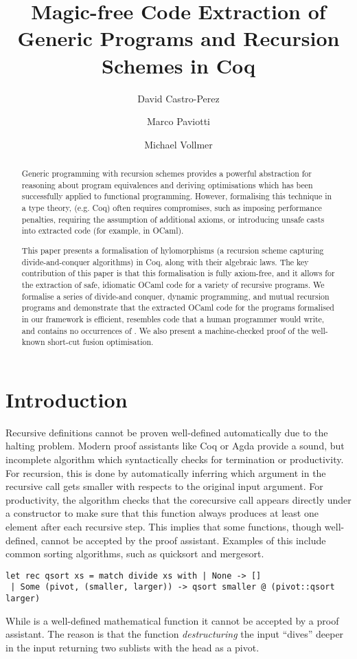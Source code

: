 \documentclass[ a4paper, UKenglish, cleveref, autoref, thm-restate]{lipics-v2021}
\title{Magic-free Code Extraction of Generic Programs and Recursion Schemes in
Coq}
\author{David Castro-Perez}{School of Computing, University of Kent}{d-castro-perez@kent.ac.uk}{}{}
\author{Marco Paviotti}{School of Computing, University of Kent}{m.paviotti@kent.ac.uk}{}{}
\author{Michael Vollmer}{School of Computing, University of Kent}{m.vollmer@kent.ac.uk}{}{}
\begin{document}
\maketitle

\begin{abstract}
  Generic programming with recursion schemes provides a powerful abstraction
  for reasoning about program equivalences and deriving optimisations which has
  been successfully applied to functional programming. However, formalising
  this technique in a type theory, (e.g. Coq) often requires compromises, such
  as imposing performance penalties, requiring the assumption of additional
  axioms, or introducing unsafe casts into extracted code (for example,
   in OCaml).

  This paper presents a formalisation of hylomorphisms (a recursion scheme
  capturing divide-and-conquer algorithms) in Coq, along with their algebraic
  laws. The key contribution of this paper is that this formalisation is fully
  axiom-free, and it allows for the extraction of safe, idiomatic OCaml
  code for a variety of recursive programs. We formalise a series of divide-and
  conquer, dynamic programming, and mutual recursion programs and demonstrate
  that the extracted OCaml code for the programs formalised in our framework is
  efficient, resembles code that a human programmer would write, and contains
  no occurrences of . We also present a machine-checked proof
  of the well-known short-cut fusion optimisation.
\end{abstract}

\section{Introduction}
\label{sec:intro}
Recursive definitions cannot be proven well-defined automatically due to the
halting problem. Modern proof assistants like Coq or Agda provide a sound, but
incomplete algorithm which syntactically checks for termination or
productivity.  For recursion, this is done by automatically inferring
which argument in the recursive call gets smaller with respects to the original
input argument.  For productivity, the algorithm checks that the corecursive
call appears directly under a constructor to make sure that this function
always produces at least one element after each recursive step.
This implies that some functions, though well-defined, cannot be accepted by
the proof assistant. Examples of this include common sorting algorithms, such
as quicksort and mergesort.
\begin{verbatim}
let rec qsort xs = match divide xs with | None -> []
 | Some (pivot, (smaller, larger)) -> qsort smaller @ (pivot::qsort larger)
\end{verbatim}
While  is a well-defined mathematical function it cannot be
accepted by a proof assistant.  The reason is that the 
function \emph{destructuring} the input ``dives'' deeper in the input returning
two sublists with the head as a pivot.
\end{document}
